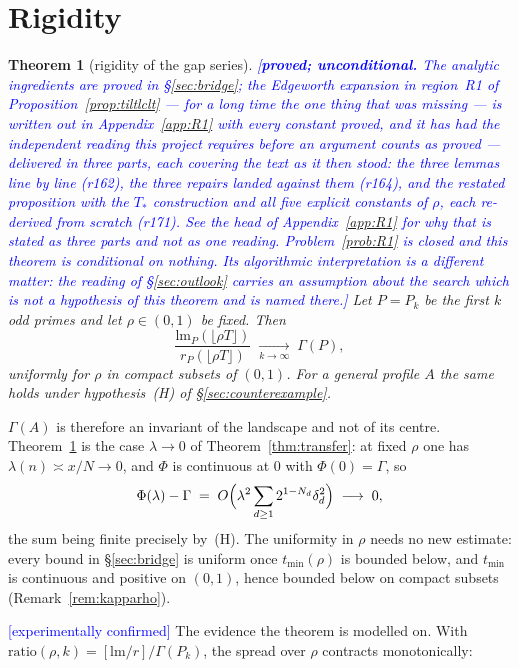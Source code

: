 \documentclass[11pt,a4paper]{article}
\theoremstyle{plain}
\newtheorem{theorem}{Theorem}[section]
\theoremstyle{definition}
\theoremstyle{remark}
\newcommand{\lm}{\mathrm{lm}}
\newcommand{\STATUS}[1]{\textcolor{blue}{\textsf{[#1]}}}
\begin{document}
\section{Rigidity}\label{sec:rigid}

\begin{theorem}[rigidity of the gap series]\label{thm:rigid}
\STATUS{\textbf{proved; unconditional.} The analytic ingredients are proved in
\S\ref{sec:bridge}; the Edgeworth expansion in region~R1 of
Proposition~\ref{prop:tiltlclt} --- for a long time the one thing that was missing --- is
written out in Appendix~\ref{app:R1} with every constant proved, and it has had the independent reading this
project requires before an argument counts as proved --- \emph{delivered in three parts, each
covering the text as it then stood}: the three lemmas line by line (r162), the three repairs
landed against them (r164), and the restated proposition with the $T_{*}$ construction and all
five explicit constants of $\rho$, each re-derived from scratch (r171). See the head of
Appendix~\ref{app:R1} for why that is stated as three parts and not as one reading.
Problem~\ref{prob:R1} is closed and this theorem is conditional on nothing. \emph{Its
algorithmic interpretation is a different matter}: the reading of \S\ref{sec:outlook} carries an
assumption about the search which is not a hypothesis of this theorem and is named there.}
Let $P=P_k$ be the first $k$ odd primes and let $\rho\in(0,1)$ be fixed. Then
\[
  \frac{\lm_P(\lfloor\rho T\rfloor)}{r_P(\lfloor\rho T\rfloor)}
  \;\xrightarrow[k\to\infty]{}\;\Gamma(P),
\]
uniformly for $\rho$ in compact subsets of $(0,1)$. For a general profile $A$ the same holds
under hypothesis~\textup{(H)} of \S\ref{sec:counterexample}.
\end{theorem}

\noindent
$\Gamma(A)$ is therefore an invariant of the landscape and not of its centre.
Theorem~\ref{thm:rigid} is the case $\lambda\to0$ of Theorem~\ref{thm:transfer}: at fixed $\rho$
one has $\lambda(n)\asymp x/N\to0$, and $\Phi$ is continuous at $0$ with $\Phi(0)=\Gamma$, so
\[
  \Phi(\lambda)-\Gamma\;=\;O\Bigl(\lambda^{2}\sum_{d\ge1}2^{1-N_d}\delta_d^{2}\Bigr)
  \;\longrightarrow\;0,
\]
the sum being finite precisely by~(H). The uniformity in $\rho$ needs no new estimate: every
bound in \S\ref{sec:bridge} is uniform once $t_{\min}(\rho)$ is bounded below, and
$t_{\min}$ is continuous and positive on $(0,1)$, hence bounded below on compact subsets
(Remark~\ref{rem:kapparho}).

\STATUS{experimentally confirmed} The evidence the theorem is modelled on. With
$\mathrm{ratio}(\rho,k)=[\lm/r]/\Gamma(P_k)$, the spread over $\rho$ contracts monotonically:
\end{document}

